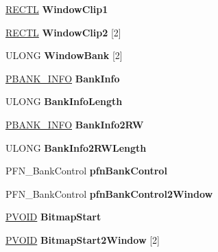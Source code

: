 \begin{DoxyCompactItemize}
\hyperlink{struct___r_e_c_t_l}{R\+E\+C\+TL} {\bfseries Window\+Clip1}
\item 
\mbox{\label{struct___d_e_v_s_u_r_f_a22884ac51767c52c722e868a61de47ac}} 
\hyperlink{struct___r_e_c_t_l}{R\+E\+C\+TL} {\bfseries Window\+Clip2} \mbox{[}2\mbox{]}
\item 
\mbox{\label{struct___d_e_v_s_u_r_f_a93205cf66b4096b53fd5cdc4c6740aed}} 
U\+L\+O\+NG {\bfseries Window\+Bank} \mbox{[}2\mbox{]}
\item 
\mbox{\label{struct___d_e_v_s_u_r_f_a2282e60a1d9aa0227a19203a37209657}} 
\hyperlink{struct_b_a_n_k___i_n_f_o}{P\+B\+A\+N\+K\+\_\+\+I\+N\+FO} {\bfseries Bank\+Info}
\item 
\mbox{\label{struct___d_e_v_s_u_r_f_ab16341f5cba8c2d08cf4448da283625d}} 
U\+L\+O\+NG {\bfseries Bank\+Info\+Length}
\item 
\mbox{\label{struct___d_e_v_s_u_r_f_a2c1b835db892bfd25e619fb89c1f8f30}} 
\hyperlink{struct_b_a_n_k___i_n_f_o}{P\+B\+A\+N\+K\+\_\+\+I\+N\+FO} {\bfseries Bank\+Info2\+RW}
\item 
\mbox{\label{struct___d_e_v_s_u_r_f_ad2ef9244c94516590d2b6981dae8ce4a}} 
U\+L\+O\+NG {\bfseries Bank\+Info2\+R\+W\+Length}
\item 
\mbox{\label{struct___d_e_v_s_u_r_f_ad596de2ddeed43f6fa16d3ab5b017350}} 
P\+F\+N\+\_\+\+Bank\+Control {\bfseries pfn\+Bank\+Control}
\item 
\mbox{\label{struct___d_e_v_s_u_r_f_aae709c02c6f1e07bcf3c8965b6fda1a4}} 
P\+F\+N\+\_\+\+Bank\+Control {\bfseries pfn\+Bank\+Control2\+Window}
\item 
\mbox{\label{struct___d_e_v_s_u_r_f_a7fbcf8ca5ff3e67b2f1a325174154cfa}} 
\hyperlink{interfacevoid}{P\+V\+O\+ID} {\bfseries Bitmap\+Start}
\item 
\mbox{\label{struct___d_e_v_s_u_r_f_a828764b9a09e04d2da9640de692e42a1}} 
\hyperlink{interfacevoid}{P\+V\+O\+ID} {\bfseries Bitmap\+Start2\+Window} \mbox{[}2\mbox{]}

\end{DoxyCompactItemize}
